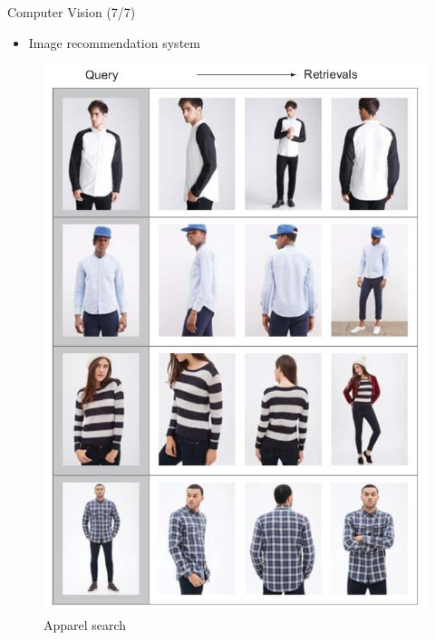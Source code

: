 \documentclass[pdf]{beamer}
\theoremstyle{mystyle}
\begin{document}
\begin{frame}{Computer Vision (7/7)}
	\begin{itemize}
	\item Image recommendation system
\end{itemize}
\begin{figure}[!ht]
	\centering
	\includegraphics[scale=.225]{images/image-recommendation.jpg}
	\caption{Apparel search \citep{elgendy2020deeplearning4vision}}
\end{figure}		
\end{frame}
\end{document}
